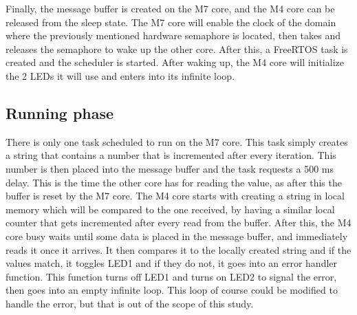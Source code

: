Finally, the message buffer is created on the M7 core, and the M4 core can be released from the sleep state. The M7 core will enable the clock of the domain where the previously mentioned hardware semaphore is located, then takes and releases the semaphore to wake up the other core. After this, a FreeRTOS task is created and the scheduler is started. After waking up, the M4 core will initialize the 2 LEDs it will use and enters into its infinite loop.

\subsection{Running phase}

There is only one task scheduled to run on the M7 core. This task simply creates a string that contains a number that is incremented after every iteration. This number is then placed into the message buffer and the task requests a 500 ms delay. This is the time the other core has for reading the value, as after this the buffer is reset by the M7 core. The M4 core starts with creating a string in local memory which will be compared to the one received, by having a similar local counter that gets incremented after every read from the buffer. After this, the M4 core busy waits until some data is placed in the message buffer, and immediately reads it once it arrives. It then compares it to the locally created string and if the values match, it toggles LED1 and if they do not, it goes into an error handler function. This function turns off LED1 and turns on LED2 to signal the error, then goes into an empty infinite loop. This loop of course could be modified to handle the error, but that is out of the scope of this study.
